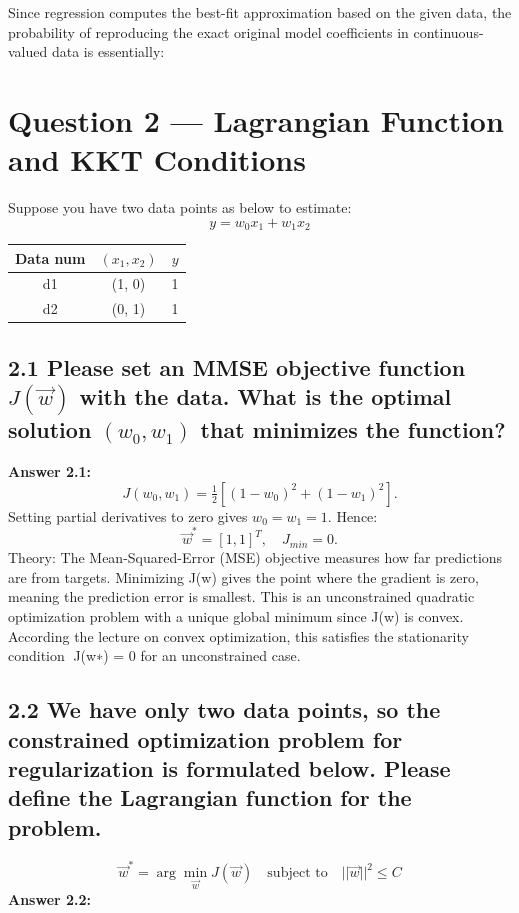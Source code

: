 \documentclass[12pt]{article}
\begin{document}
Since regression computes the best-fit approximation based on the given data, the probability of reproducing the exact original model coefficients in continuous-valued data is essentially:

\newpage
\section*{Question 2 — Lagrangian Function and KKT Conditions}

Suppose you have two data points as below to estimate:
\[
y = w_0x_1 + w_1x_2
\]

\begin{center}
\begin{tabular}{ccc}
\toprule
\textbf{Data num} & $(x_1, x_2)$ & $y$ \\
\midrule
d1 & (1, 0) & 1 \\
d2 & (0, 1) & 1 \\
\bottomrule
\end{tabular}
\end{center}

\subsection*{2.1
Please set an MMSE objective function $J(\vec{w})$ with the data. What is the optimal solution $(w_0, w_1)$ that minimizes the function?}
\textbf{Answer 2.1:}
\[
J(w_0,w_1)=\tfrac12[(1-w_0)^2+(1-w_1)^2].
\]
Setting partial derivatives to zero gives $w_0=w_1=1$.  
Hence:
\[
\boxed{\vec w^*=[1,1]^T,\quad J_{min}=0.}
\]
{Theory: The Mean-Squared-Error (MSE) objective measures how far predictions are from targets. Minimizing J(⃗w) gives the point where the gradient is zero, meaning the prediction error is smallest. This is an unconstrained quadratic optimization problem with a unique global minimum since J(⃗w) is convex. According the lecture on convex optimization, this satisfies the stationarity condition ∇J(⃗w∗) = 0 for an unconstrained case.}

\subsection*{2.2
We have only two data points, so the constrained optimization problem for regularization is formulated below. Please define the Lagrangian function for the problem.}
\[
\vec{w}^* = \arg\min_{\vec{w}} J(\vec{w}) \quad \text{subject to} \quad ||\vec{w}||^2 \le C
\]
\textbf{Answer 2.2:}
\end{document}
